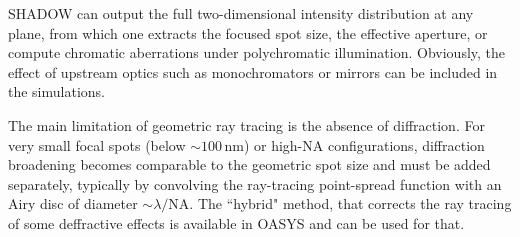 SHADOW can output the full two-dimensional intensity distribution at any plane, from which one extracts the focused spot size, the effective aperture, or compute chromatic aberrations under polychromatic illumination. Obviously, the effect of upstream optics such as monochromators or mirrors can be included in the simulations. 

The main limitation of geometric ray tracing is the absence of diffraction. For very small focal spots (below $\sim100\,\mathrm{nm}$) or high-NA configurations, diffraction broadening becomes comparable to the geometric spot size and must be added separately, typically by convolving the ray-tracing point-spread function with an Airy disc of diameter $\sim\lambda/\mathrm{NA}$. The ``hybrid" method, that corrects the ray tracing of some deffractive effects is available in OASYS and can be used for that.